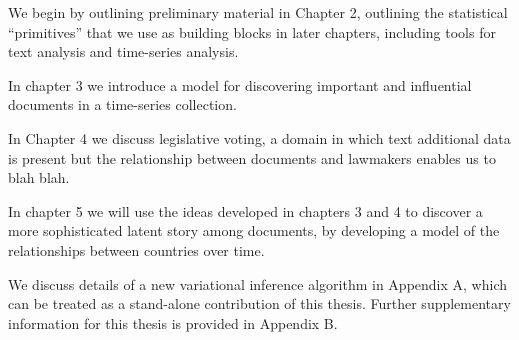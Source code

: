 We begin by outlining preliminary material in Chapter 2, outlining the
statistical ``primitives'' that we use as building blocks in later
chapters, including tools for text analysis and time-series analysis.

In chapter 3 we introduce a model for discovering important and
influential documents in a time-series collection.

In Chapter 4 we discuss legislative voting, a domain in which text
additional data is present but the relationship between documents and
lawmakers enables us to blah blah.

In chapter 5 we will use the ideas developed in chapters 3 and 4 to
discover a more sophisticated latent story among documents, by
developing a model of the relationships between countries over time.

We discuss details of a new variational inference algorithm in
Appendix A, which can be treated as a stand-alone contribution of this
thesis.  Further supplementary information for this thesis is provided
in Appendix B.
